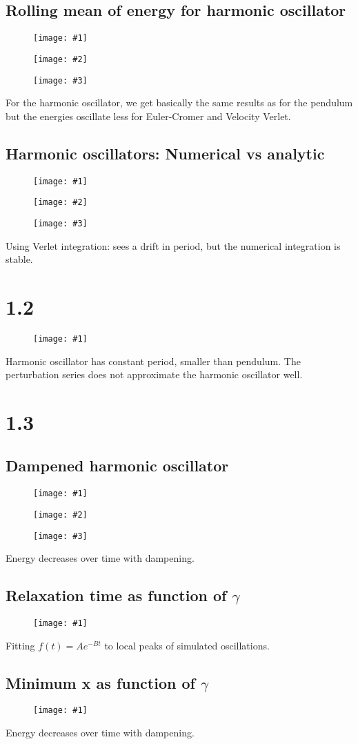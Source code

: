 \documentclass[11pt]{article}
\newcommand{\triplefigure}[3]{
\begin{figure}[H]
  \centering
  \begin{minipage}{0.3\textwidth}
    \centering
    \texttt{[image: \#1]}
  \end{minipage}
  \begin{minipage}{0.3\textwidth}
    \centering
    \texttt{[image: \#2]}
  \end{minipage}
  \begin{minipage}{0.3\textwidth}
    \centering
    \texttt{[image: \#3]}
  \end{minipage}
\end{figure}
}
\newcommand{\singlefigure}[1]{
\begin{figure}[H]
  \centering
  \begin{minipage}{0.4\textwidth}
    \centering
    \texttt{[image: \#1]}
  \end{minipage}
\end{figure}
}
\begin{document}
\subsection*{Rolling mean of energy for harmonic oscillator}
\triplefigure{./plots/1_1/rollingMean_harmonic_1.png}{./plots/1_1/rollingMean_harmonic_2.png}{./plots/1_1/rollingMean_harmonic_3.png}
For the harmonic oscillator, we get basically the same results as for the pendulum but the energies oscillate less for Euler-Cromer and Velocity Verlet.

\subsection*{Harmonic oscillators: Numerical vs analytic}
\triplefigure{./plots/1_1/comparison_numanalytic_1.png}{./plots/1_1/comparison_numanalytic_2.png}{./plots/1_1/comparison_numanalytic_3.png}
Using Verlet integration: sees a drift in period, but the numerical integration is stable.

\section*{1.2}
\singlefigure{./plots/1_2/period.png}
Harmonic oscillator has constant period, smaller than pendulum.
The perturbation series does not approximate the harmonic oscillator well.

\section*{1.3}

\subsection*{Dampened harmonic oscillator}
\triplefigure{./plots/1_3/dampened_dx.png}{./plots/1_3/dampened_E.png}{./plots/1_3/dampened_x.png}
Energy decreases over time with dampening.

\subsection*{Relaxation time as function of $\gamma$}
\singlefigure{./plots/1_3/study.png}
Fitting $f(t) = A e^{-Bt}$ to local peaks of simulated oscillations.

\subsection*{Minimum x as function of $\gamma$}
\singlefigure{./plots/1_3/study_2.png}
Energy decreases over time with dampening.
\end{document}

